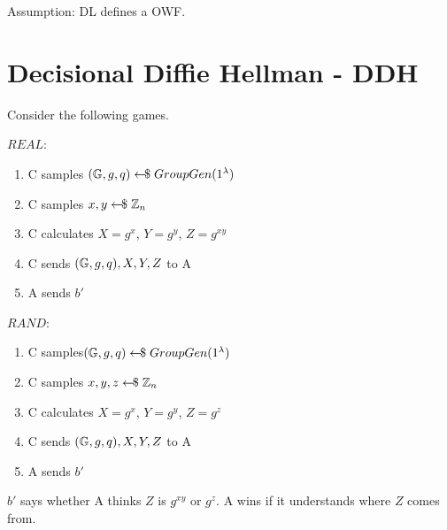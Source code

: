 Assumption: DL defines a OWF.


\section{Decisional Diffie Hellman - DDH}
Consider the following games.

\begin{multicols}{2}
    $REAL$:
    \begin{enumerate}
        \item C samples \newline$(\mathbb{G},g,q) \leftarrow\kern-0.42em{\$} \; GroupGen(1^\lambda)$
        \item C samples $x,y \leftarrow\kern-0.42em{\$} \; \mathbb{Z}_n$
        \item C calculates $X = g^x$, $Y = g^y$, $Z = g^{xy}$
        \item C sends $(\mathbb{G},g,q), X, Y, Z$ to A
        \item A sends $b'$
    \end{enumerate}

    \columnbreak

    $RAND$:
    \begin{enumerate}
        \item C samples\newline $(\mathbb{G},g,q) \leftarrow\kern-0.42em{\$} \; GroupGen(1^\lambda)$
        \item C samples $x,y,z \leftarrow\kern-0.42em{\$} \; \mathbb{Z}_n$
        \item C calculates $X = g^x$, $Y = g^y$, $Z = g^z$
        \item C sends $(\mathbb{G},g,q), X, Y, Z$ to A
        \item A sends $b'$
    \end{enumerate}
\end{multicols}
$b'$ says whether A thinks $Z$ is $g^{xy}$ or $g^z$.\newline
A wins if it understands where $Z$ comes from.